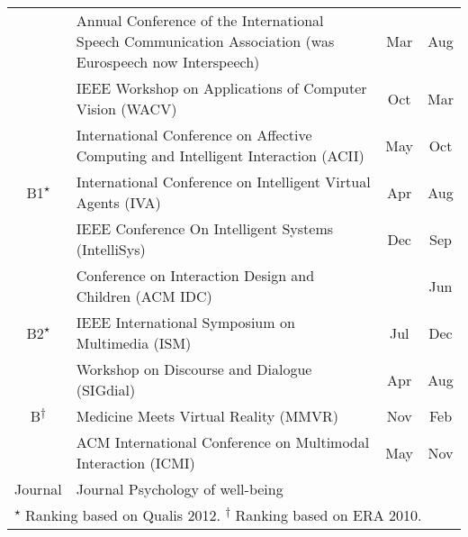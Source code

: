 \begin{sidewaystable}
\begin{tabular}{c  m{16cm}  c  c}
                                  & Annual Conference of the International Speech Communication Association (was Eurospeech now Interspeech) & Mar                & Aug        \\ \cmidrule{2-4}
                                  & IEEE Workshop on Applications of Computer Vision (WACV)                                                  & Oct                & Mar        \\ 
\midrule
\multirow{3}{*}{B1\textsuperscript{$\star$}}               & International Conference on Affective Computing and Intelligent Interaction (ACII)                       & May                & Oct        \\ \cmidrule{2-4}
                                  & International Conference on Intelligent Virtual Agents (IVA)                                             & Apr                & Aug        \\ \cmidrule{2-4}
                                  & IEEE Conference On Intelligent Systems (IntelliSys)                                                      & Dec                & Sep        \\ 
\midrule
\multirow{3}{*}{B2\textsuperscript{$\star$}}               & Conference on Interaction Design and Children (ACM IDC)                                                  &                    & Jun        \\ \cmidrule{2-4}
                                  & IEEE International Symposium on Multimedia (ISM)                                                         & Jul                & Dec        \\ \cmidrule{2-4}
                                  & Workshop on Discourse and Dialogue (SIGdial)                                                             & Apr                & Aug        \\ 
\midrule
B\textsuperscript{$\dagger$}                                 & Medicine Meets Virtual Reality (MMVR)                                                                    & Nov                & Feb        \\ \cmidrule{2-4}
                                  & ACM International Conference on Multimodal Interaction (ICMI)                                            & May                & Nov        \\ 
\midrule
Journal                           & Journal Psychology of well-being                                                                         &                    &           \\ 
\midrule[\heavyrulewidth]

\multicolumn{4}{l}{\footnotesize{\textsuperscript{$\star$} Ranking based on Qualis 2012. \textsuperscript{$\dagger$} Ranking based on ERA 2010.}} \\
	\bottomrule

\end{tabular}
\end{sidewaystable}

